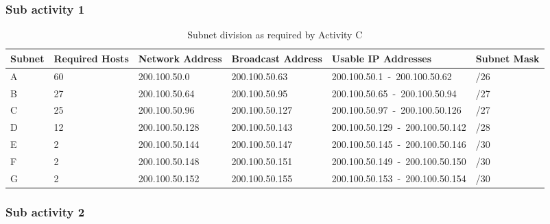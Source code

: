 \documentclass{lab_sheet}
\begin{document}
\subsubsection*{Sub activity 1}

\begin{table}[H]
  \centering
  \begin{tabular}{|C{1cm}||C{1.5cm}||C{2.3cm}||C{2.3cm}||C{5cm}||C{1cm}|}
   \hline
   Subnet&Required Hosts&Network Address&Broadcast Address&
   Usable IP Addresses&Subnet Mask\\
   \hline
   A & 60 & 200.100.50.0 & 200.100.50.63 & 200.100.50.1~-~200.100.50.62 & /26\\
   \hline
   B & 27 & 200.100.50.64	 & 200.100.50.95 & 200.100.50.65~-~200.100.50.94 & /27\\
   \hline
   C & 25 & 200.100.50.96 & 200.100.50.127 & 200.100.50.97~-~200.100.50.126 & /27\\
   \hline
   D & 12 & 200.100.50.128 & 200.100.50.143 & 200.100.50.129~-~200.100.50.142 & /28\\
   \hline
   E & 2 & 200.100.50.144 & 200.100.50.147 & 200.100.50.145~-~200.100.50.146 & /30\\
   \hline
   F & 2 & 200.100.50.148 & 200.100.50.151 & 200.100.50.149~-~200.100.50.150 & /30\\
   \hline
   G & 2 & 200.100.50.152 & 200.100.50.155 & 200.100.50.153~-~200.100.50.154 & /30\\
   \hline
  \end{tabular}
  \caption{Subnet division as required by Activity C}
  \end{table}


\subsubsection*{Sub activity 2}
\end{document}
